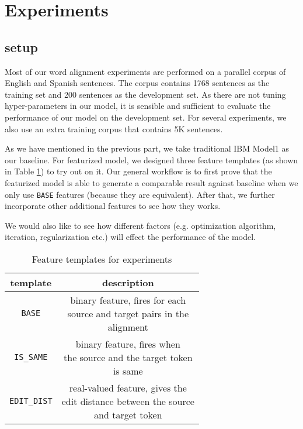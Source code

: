 \documentclass[11pt,letterpaper]{article}
\begin{document}
\section{Experiments}
\subsection{setup}
Most of our word alignment experiments are performed on a parallel corpus of English and Spanish sentences.
The corpus contains 1768 sentences as the training set and 200 sentences as the development set.
As there are not tuning hyper-parameters in our model, it is sensible and sufficient to evaluate the performance of our model on the development set.
For several experiments, we also use an extra training corpus that contains 5K %
sentences.

As we have mentioned in the previous part, we take traditional IBM Model1 as our baseline.
For featurized model, we designed three feature templates (as shown in Table \ref{featureset-table}) to try out on it.
Our general workflow is to first prove that the featurized model is able to generate a comparable result against baseline when we only use \texttt{BASE} features (because they are equivalent).
After that, we further incorporate other additional features to see how they works.

We would also like to see how different factors (e.g. optimization algorithm, iteration, regularization etc.) will effect the performance of the model.

\begin{table}
\begin{center}
\begin{tabular}{|c|c|}
\hline 
\bf template & \bf description \\
\hline
\texttt{BASE} & \makecell[l]{binary feature, fires for each\\ source and target pairs in the\\ alignment} \\
\texttt{IS\_SAME} & \makecell[l]{binary feature, fires when\\ the source and the target token\\ is same}\\
\texttt{EDIT\_DIST} & \makecell[l]{real-valued feature, gives the\\ edit distance between the source\\ and target token}\\
\hline
\end{tabular}
\end{center}
\caption{\label{featureset-table} Feature templates for experiments}
\end{table}
\end{document}
